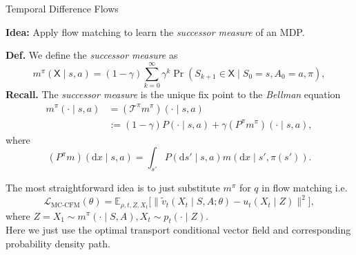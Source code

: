 \documentclass{beamer}
\begin{document}
\begin{frame}{Temporal Difference Flows \cite{farebrotherTemporalDifferenceFlows2025}}
    \begin{blackblock}
        \textbf{Idea:} Apply flow matching to learn the \emph{successor measure} of an MDP.
    \end{blackblock}
    \textbf{Def.} We define the \emph{successor measure} as
\[ m^{\pi}(\mathsf{X} \mid s, a) = (1 - \gamma) \sum_{k=0}^{\infty} \gamma^{k} \Pr(S_{k+1} \in \mathsf{X} \mid S_{0} = s, A_{0} = a, \pi), \]
\textbf{Recall.} The \emph{successor measure} is the unique fix point to the \emph{Bellman} equation
\begin{align*}
 m^{\pi}(\cdot \mid s, a) &= (\mathcal{T}^{\pi} m^{\pi}) (\cdot \mid s, a) \\
                          &:= (1 - \gamma)P(\cdot \mid s, a) + \gamma (P^{\pi} m^{\pi}) (\cdot \mid s, a)
,\end{align*}
where
\[ (P^{\pi}m) (\mathrm{d}x \mid s, a) = \int_{s'} P(\mathrm{d}s' \mid s, a) m(\mathrm{d}x \mid s', \pi(s')). \]
\end{frame}
\begin{frame}
    The most straightforward idea is to just substitute \( m^{\pi} \) for \( q \) in flow matching i.e.
\[ \mathcal{L}_{\text{MC-CFM}}(\theta) = \mathbb{E}_{\rho, t, Z, X_t} \Big[ \big\| \tilde{v}_t(X_t \mid S, A; \theta) - u_{t}(X_t \mid Z) \big\|^2 \Big], \] where $Z = X_1 \sim m^{\pi}(\cdot \mid S, A), X_t \sim p_{t}(\cdot \mid Z).$ \\
\vskip 5pt
Here we just use the optimal transport conditional vector field and corresponding probability density path. \\
\vskip 5pt
    \end{frame}
\end{document}
